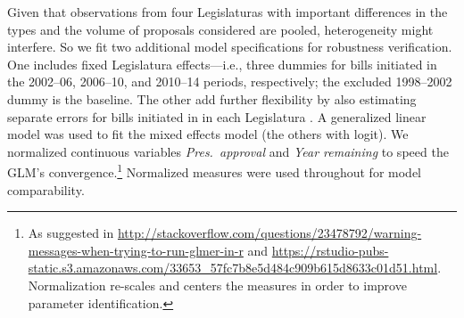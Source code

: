 \documentclass[letter,12pt]{article}
\begin{document}
Given that observations from four Legislaturas with important differences in the types and the volume of proposals considered \citep{aleman.navia.UrgChi.2009} are pooled, heterogeneity might interfere. So we fit two additional model specifications for robustness verification. One includes fixed Legislatura effects---i.e., three dummies for bills initiated in the 2002--06, 2006--10, and 2010--14 periods, respectively; the excluded 1998--2002 dummy is the baseline. The other add further flexibility by also estimating separate errors for bills initiated in in each Legislatura \citep[a so-called mixed effects model,][:262,302]{gelman.hill.2007}. A generalized linear model was used to fit the mixed effects model (the others with logit). We normalized continuous variables \emph{Pres.~approval} and \emph{Year remaining} to speed the GLM's convergence.\footnote{As suggested in \url{http://stackoverflow.com/questions/23478792/warning-messages-when-trying-to-run-glmer-in-r} and \url{https://rstudio-pubs-static.s3.amazonaws.com/33653_57fc7b8e5d484c909b615d8633c01d51.html}. Normalization re-scales and centers the measures in order to improve parameter identification.} Normalized measures were used throughout for model comparability.
\end{document}
